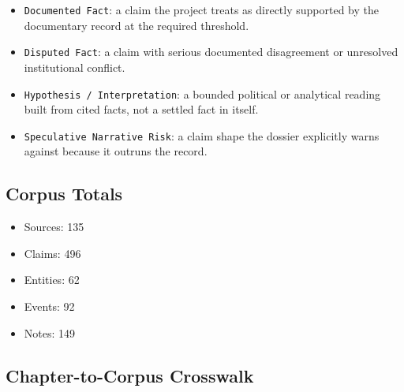 \documentclass[
  american,
  11pt,
  letterpaper,
]{article}
\providecommand{\tightlist}{%
  \setlength{\itemsep}{0pt}\setlength{\parskip}{0pt}}
\begin{document}
\begin{itemize}
\tightlist
\item
  \texttt{Documented\ Fact}: a claim the project treats as directly
  supported by the documentary record at the required threshold.
\item
  \texttt{Disputed\ Fact}: a claim with serious documented disagreement
  or unresolved institutional conflict.
\item
  \texttt{Hypothesis\ /\ Interpretation}: a bounded political or
  analytical reading built from cited facts, not a settled fact in
  itself.
\item
  \texttt{Speculative\ Narrative\ Risk}: a claim shape the dossier
  explicitly warns against because it outruns the record.
\end{itemize}

\subsection{Corpus Totals}\label{corpus-totals}

\begin{itemize}
\tightlist
\item
  Sources: 135
\item
  Claims: 496
\item
  Entities: 62
\item
  Events: 92
\item
  Notes: 149
\end{itemize}

\subsection{Chapter-to-Corpus
Crosswalk}\label{chapter-to-corpus-crosswalk}
\end{document}
